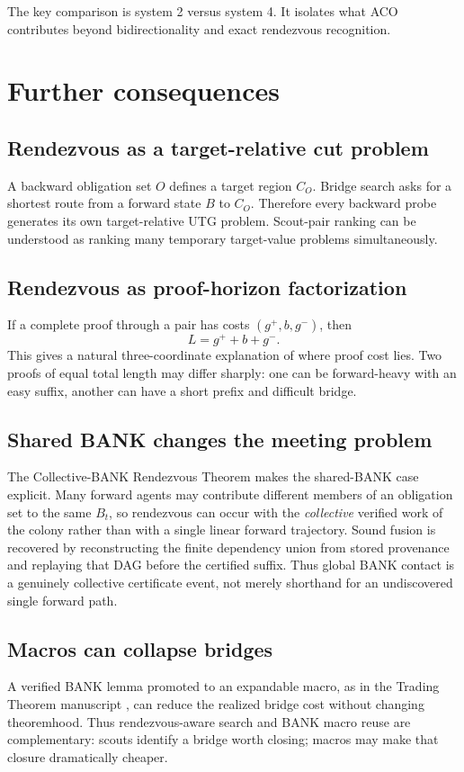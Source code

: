 \documentclass[11pt]{article}
\begin{document}
The key comparison is system 2 versus system 4. It isolates what ACO contributes beyond bidirectionality and exact rendezvous recognition.

\section{Further consequences}

\subsection{Rendezvous as a target-relative cut problem}
A backward obligation set $O$ defines a target region $C_O$. Bridge search asks for a shortest route from a forward state $B$ to $C_O$. Therefore every backward probe generates its own target-relative UTG problem. Scout-pair ranking can be understood as ranking many temporary target-value problems simultaneously.

\subsection{Rendezvous as proof-horizon factorization}
If a complete proof through a pair has costs $(g^+,b,g^-)$, then
\[
L=g^++b+g^-.
\]
This gives a natural three-coordinate explanation of where proof cost lies. Two proofs of equal total length may differ sharply: one can be forward-heavy with an easy suffix, another can have a short prefix and difficult bridge.

\subsection{Shared BANK changes the meeting problem}
The Collective-BANK Rendezvous Theorem makes the shared-BANK case explicit. Many forward agents may contribute different members of an obligation set to the same $B_t$, so rendezvous can occur with the \emph{collective} verified work of the colony rather than with a single linear forward trajectory. Sound fusion is recovered by reconstructing the finite dependency union from stored provenance and replaying that DAG before the certified suffix. Thus global BANK contact is a genuinely collective certificate event, not merely shorthand for an undiscovered single forward path.

\subsection{Macros can collapse bridges}
A verified BANK lemma promoted to an expandable macro, as in the Trading Theorem manuscript \cite{Trading}, can reduce the realized bridge cost without changing theoremhood. Thus rendezvous-aware search and BANK macro reuse are complementary: scouts identify a bridge worth closing; macros may make that closure dramatically cheaper.
\end{document}
